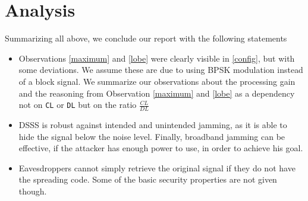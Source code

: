 \documentclass[12pt,a4paper]{article}
\begin{document}
		\section{Analysis}
		Summarizing all above, we conclude our report with the following statements
		
		\begin{itemize}
			\item
			Observations \ref{maximum} and \ref{lobe} were clearly visible in \autoref{config}, but with some deviations. We assume these are due to using BPSK modulation instead of a block signal.
			We summarize our observations about the processing gain and the reasoning from Observation \ref{maximum} and \ref{lobe} as a dependency not on \texttt{CL} or \texttt{DL} but on the ratio $\frac{CL}{DL}$
		
			\item
			DSSS is robust against intended and unintended jamming, as it is able to hide the signal below the noise level.
			Finally, broadband jamming can be effective, if the attacker has enough power to use, in order to achieve his goal.
		
			\item Eavesdroppers cannot simply retrieve the original signal if they do not have the spreading code. Some of the basic security properties are not given though.
			
			
		\end{itemize}
		
		
		
\end{document}
